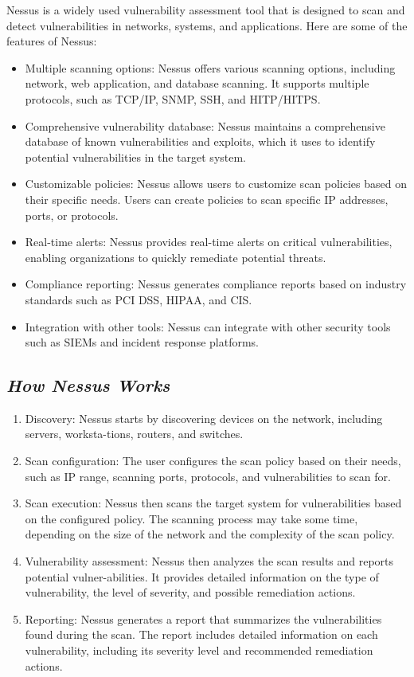 \documentclass{article}
\begin{document}
Nessus is a widely used vulnerability assessment tool that is designed to scan and detect vulnerabilities in networks, systems, and applications. Here are some of the features of Nessus:
\begin{itemize}
	\item Multiple scanning options: Nessus offers various scanning options, including network, web application, and database scanning. It supports multiple protocols, such as TCP/IP, SNMP, SSH, and HITP/HITPS.
	\item Comprehensive vulnerability database: Nessus maintains a comprehensive database of known vulnerabilities and exploits, which it uses to identify potential vulnerabilities in the target system.
	\item Customizable policies: Nessus allows users to customize scan policies based on their specific needs. Users can create policies to scan specific IP addresses, ports, or protocols.
	\item Real-time alerts: Nessus provides real-time alerts on critical vulnerabilities, enabling organizations to quickly remediate potential threats.
	\item Compliance reporting: Nessus generates compliance reports based on industry standards such as PCI DSS, HIPAA, and CIS.
	\item Integration with other tools: Nessus can integrate with other security tools such as SIEMs and incident response platforms.
	
\end{itemize}
\subsection{\textit{How Nessus Works}}
\begin{enumerate}
	\item Discovery: Nessus starts by discovering devices on the network, including servers, worksta-tions, routers, and switches.
	\item Scan configuration: The user configures the scan policy based on their needs, such as IP range, scanning ports, protocols, and vulnerabilities to scan for.
	\item Scan execution: Nessus then scans the target system for vulnerabilities based on the configured policy. The scanning process may take some time, depending on the size of the network and the complexity of the scan policy.
	\item Vulnerability assessment: Nessus then analyzes the scan results and reports potential vulner-abilities. It provides detailed information on the type of vulnerability, the level of severity, and possible remediation actions.
	\item Reporting: Nessus generates a report that summarizes the vulnerabilities found during the scan. The report includes detailed information on each vulnerability, including its severity level and recommended remediation actions.
	
\end{enumerate}
\end{document}
